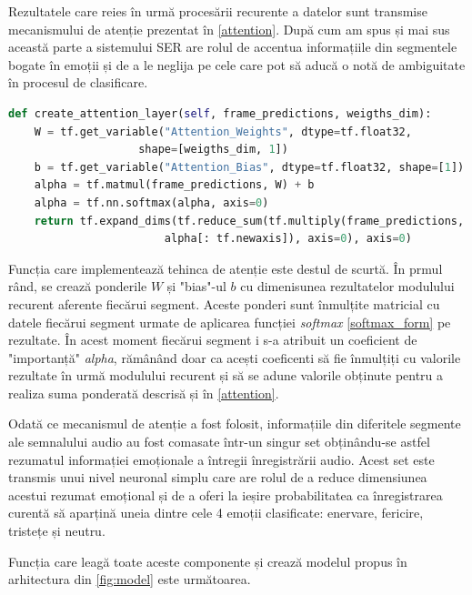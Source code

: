 \documentclass[a4paper,12pt]{book}
\begin{document}
		Rezultatele care reies în urmă procesării recurente a datelor sunt transmise mecanismului de atenție prezentat în \ref{attention}. După cum am spus și mai sus această parte a sistemului SER are rolul de accentua informațiile din segmentele bogate în emoții și de a le neglija pe cele care pot să aducă o notă de ambiguitate în procesul de clasificare. \par
		
		\begin{lstlisting}[language=Python, caption={Metoda care implementează mecanismul de atenție, \ref{attention}.}]	
def create_attention_layer(self, frame_predictions, weigths_dim):
	W = tf.get_variable("Attention_Weights", dtype=tf.float32, 
					shape=[weigths_dim, 1])
	b = tf.get_variable("Attention_Bias", dtype=tf.float32, shape=[1])	
	alpha = tf.matmul(frame_predictions, W) + b
	alpha = tf.nn.softmax(alpha, axis=0)
	return tf.expand_dims(tf.reduce_sum(tf.multiply(frame_predictions, 
						alpha[: tf.newaxis]), axis=0), axis=0)		\end{lstlisting}		
		Funcția care implementează tehinca de atenție este destul de scurtă. În prmul rând, se crează ponderile $W$ și "bias"-ul $b$ cu dimenisunea rezultatelor modulului recurent aferente fiecărui segment. Aceste ponderi sunt înmulțite matricial cu datele fiecărui segment urmate de aplicarea funcției \textit{softmax} \ref{softmax_form} pe rezultate. În acest moment fiecărui segment i s-a atribuit un coeficient de "importanță" \textit{alpha}, rămânând doar ca acești coeficenti să fie înmulțiți cu valorile rezultate în urmă modulului recurent și să se adune valorile obținute pentru a realiza suma ponderată descrisă și în \ref{attention}. \par
		
		Odată ce mecanismul de atenție a fost folosit, informațiile din diferitele segmente ale semnalului audio au fost comasate într-un singur set obținându-se astfel rezumatul informației emoționale a întregii înregistrării audio. Acest set este transmis unui nivel neuronal simplu care are rolul de a reduce dimensiunea acestui rezumat emoțional și de a oferi la ieșire probabilitatea ca înregistrarea curentă să aparțină uneia dintre cele 4 emoții clasificate: enervare, fericire, tristețe și neutru. \par
		
		Funcția care leagă toate aceste componente și crează modelul propus în arhitectura din \ref{fig:model} este următoarea.
		
\end{document}
